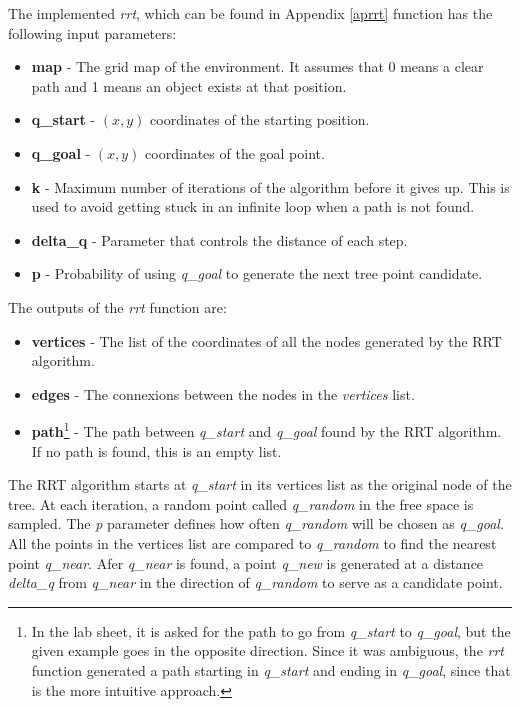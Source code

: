 \documentclass[journal]{IEEEtran}
\begin{document}
The implemented \textit{rrt}, which can be found in Appendix \ref{aprrt} function has the following input parameters:
\begin{itemize}
	\item \textbf{map} - The grid map of the environment. It assumes that 0 means a clear path and 1 means an object exists at that position.
	\item \textbf{q\_start} - $(x,y)$ coordinates of the starting position.
	\item \textbf{q\_goal} - $(x,y)$ coordinates of the goal point.
	\item \textbf{k} - Maximum number of iterations of the algorithm before it gives up. This is used to avoid getting stuck in an infinite loop when a path is not found.
	\item \textbf{delta\_q} - Parameter that controls the distance of each step.
	\item \textbf{p} - Probability of using \textit{q\_goal} to generate the next tree point candidate.
\end{itemize}

The outputs of the \textit{rrt} function are:
\begin{itemize}
	\item \textbf{vertices} - The list of the coordinates of all the nodes generated by the RRT algorithm.
	\item \textbf{edges} - The connexions between the nodes in the \textit{vertices} list.
	\item \textbf{path}\footnote{In the lab sheet, it is asked for the path to go from \textit{q\_start} to \textit{q\_goal}, but the given example goes in the opposite direction. Since it was ambiguous, the \textit{rrt} function generated a path starting in \textit{q\_start} and ending in \textit{q\_goal}, since that is the more intuitive approach.} - The path between \textit{q\_start} and \textit{q\_goal} found by the RRT algorithm. If no path is found, this is an empty list.
\end{itemize}

The RRT algorithm starts at \textit{q\_start} in its vertices list as the original node of the tree. At each iteration, a random point called \textit{q\_random} in the free space is sampled. The \textit{p} parameter defines how often \textit{q\_random} will be chosen as \textit{q\_goal}. All the points in the vertices list are compared to \textit{q\_random} to find the nearest point \textit{q\_near}. Afer \textit{q\_near} is found, a point \textit{q\_new} is generated at a distance \textit{delta\_q} from \textit{q\_near} in the direction of \textit{q\_random} to serve as a candidate point. 
\end{document}
